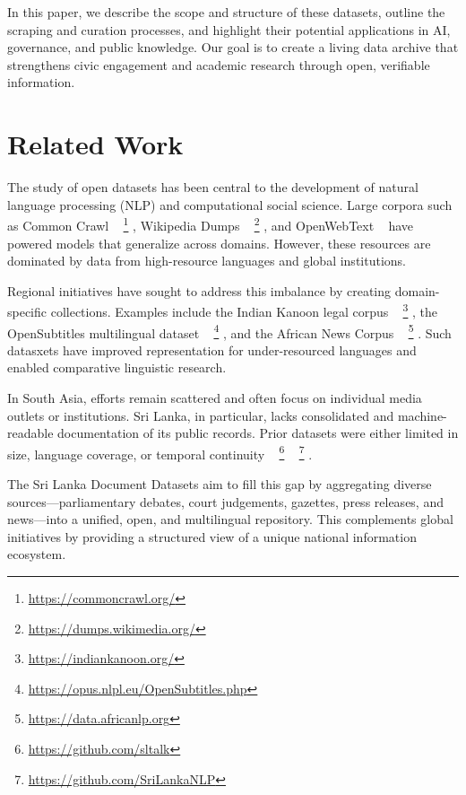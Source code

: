 \documentclass[10pt,a4paper]{article}%
\begin{document}
%
In this paper, we describe the scope and structure of these datasets, outline the scraping and curation processes, and highlight their potential applications in AI, governance, and public knowledge. Our goal is to create a living data archive that strengthens civic engagement and academic research through open, verifiable information.%

%
\section{Related Work}%
\label{sec:RelatedWork}%
The study of open datasets has been central to the
 development of natural language processing (NLP)
 and computational social science. Large corpora such
 as Common Crawl%
~%
\footnote{\href{https://commoncrawl.org/}{https://commoncrawl.org/}}%
, Wikipedia
 Dumps%
~%
\footnote{\href{https://dumps.wikimedia.org/}{https://dumps.wikimedia.org/}}%
, and OpenWebText%
~%
\citep{openwebtext2019}%
have powered models that generalize across domains. However, these resources are dominated by data from high-resource languages and global institutions.%

%
Regional initiatives have sought to address this
 imbalance by creating domain-specific collections.
 Examples include the Indian Kanoon legal corpus%
~%
\footnote{\href{https://indiankanoon.org/}{https://indiankanoon.org/}}%
, the OpenSubtitles
 multilingual dataset%
~%
\footnote{\href{https://opus.nlpl.eu/OpenSubtitles.php}{https://opus.nlpl.eu/OpenSubtitles.php}}%
, and the African News Corpus%
~%
\footnote{\href{https://data.africanlp.org}{https://data.africanlp.org}}%
. Such datasxets have improved representation for under-resourced languages and enabled comparative linguistic research.%

%
In South Asia, efforts remain scattered and often
 focus on individual media outlets or institutions.
 Sri Lanka, in particular, lacks consolidated and
 machine-readable documentation of its public
 records. Prior datasets were either limited in size,
 language coverage, or temporal continuity%
~%
\footnote{\href{https://github.com/sltalk}{https://github.com/sltalk}}%
%
~%
\footnote{\href{https://github.com/SriLankaNLP}{https://github.com/SriLankaNLP}}%
.%

%
The Sri Lanka Document Datasets aim to fill this gap by aggregating diverse sources—parliamentary debates, court judgements, gazettes, press releases, and news—into a unified, open, and multilingual repository. This complements global initiatives by providing a structured view of a unique national information ecosystem.%
\end{document}
